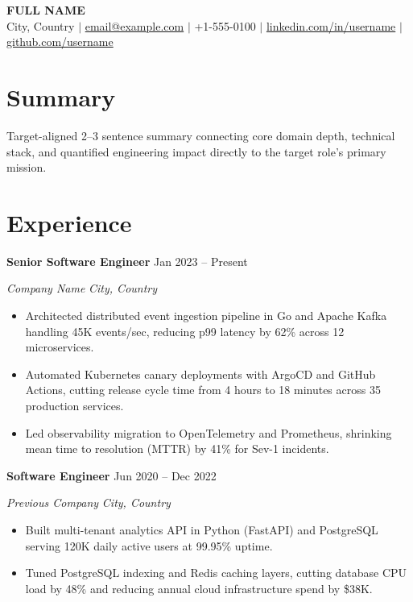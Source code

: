 \documentclass[10pt,a4paper]{article}
\newcommand{\resumeRole}[4]{%
  \vspace{4pt}%
  {\textbf{#1} \hfill #2 \par}%
  {\textit{#3} \hfill \textit{#4} \par}%
}
\begin{document}
\begin{center}
  {\LARGE \textbf{FULL NAME}} \\[4pt]
  City, Country $|$
  \href{mailto:email@example.com}{email@example.com} $|$
  +1-555-0100 $|$
  \href{https://linkedin.com/in/username}{linkedin.com/in/username} $|$
  \href{https://github.com/username}{github.com/username}
\end{center}

\section{Summary}
Target-aligned 2--3 sentence summary connecting core domain depth, technical stack, and quantified engineering impact directly to the target role's primary mission.

\section{Experience}

\resumeRole{Senior Software Engineer}{Jan 2023 -- Present}{Company Name}{City, Country}
\begin{itemize}
  \item Architected distributed event ingestion pipeline in Go and Apache Kafka handling 45K events/sec, reducing p99 latency by 62\% across 12 microservices.
  \item Automated Kubernetes canary deployments with ArgoCD and GitHub Actions, cutting release cycle time from 4 hours to 18 minutes across 35 production services.
  \item Led observability migration to OpenTelemetry and Prometheus, shrinking mean time to resolution (MTTR) by 41\% for Sev-1 incidents.
\end{itemize}

\resumeRole{Software Engineer}{Jun 2020 -- Dec 2022}{Previous Company}{City, Country}
\begin{itemize}
  \item Built multi-tenant analytics API in Python (FastAPI) and PostgreSQL serving 120K daily active users at 99.95\% uptime.
  \item Tuned PostgreSQL indexing and Redis caching layers, cutting database CPU load by 48\% and reducing annual cloud infrastructure spend by \$38K.
\end{itemize}

\end{document}
